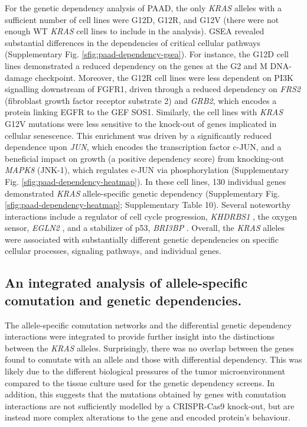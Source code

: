 \documentclass[english, 10pt, letterpaper]{article}
\newcommand{\KRAS}{\emph{KRAS}}
\begin{document}
For the genetic dependency analysis of PAAD, the only \KRAS{} alleles with a sufficient number of cell lines were G12D, G12R, and G12V (there were not enough WT \KRAS{} cell lines to include in the analysis).
GSEA revealed substantial differences in the dependencies of critical cellular pathways (Supplementary Fig. \ref{sfig:paad-dependency-gsea}).
For instance, the G12D cell lines demonstrated a reduced dependency on the genes at the G2 and M DNA-damage checkpoint.
Moreover, the G12R cell lines were less dependent on PI3K signalling downstream of FGFR1, driven through a reduced dependency on \emph{FRS2} (fibroblast growth factor receptor substrate 2) and \emph{GRB2}, which encodes a protein linking EGFR to the GEF SOS1.
Similarly, the cell lines with \KRAS{} G12V mutations were less sensitive to the knock-out of genes implicated in cellular senescence.
This enrichment was driven by a significantly reduced dependence upon \emph{JUN}, which encodes the transcription factor c-JUN, and a beneficial impact on growth (a positive dependency score) from knocking-out \emph{MAPK8} (JNK-1), which regulates c-JUN via phosphorylation (Supplementary Fig. \ref{sfig:paad-dependency-heatmap}).
In these cell lines, 130 individual genes demonstrated \KRAS{} allele-specific genetic dependency (Supplementary Fig. \ref{sfig:paad-dependency-heatmap}; Supplementary Table 10).
Several noteworthy interactions include a regulator of cell cycle progression, \emph{KHDRBS1} \cite{Barlat1997ADomain}, the oxygen sensor, \emph{EGLN2} \cite{Ivan2017TheFeedbacks}, and a stabilizer of p53, \emph{BRI3BP} \cite{Ha2008HCCRBP-1Stabilization}.
Overall, the \KRAS{} alleles were associated with substantially different genetic dependencies on specific cellular processes, signaling pathways, and individual genes.


\subsection*{An integrated analysis of allele-specific comutation and genetic dependencies.}


The allele-specific comutation networks and the differential genetic dependency interactions were integrated to provide further insight into the distinctions between the \KRAS{} alleles.
Surprisingly, there was no overlap between the genes found to comutate with an allele and those with differential dependency.
This was likely due to the different biological pressures of the tumor microenvironment compared to the tissue culture used for the genetic dependency screens.
In addition, this suggests that the mutations obtained by genes with comutation interactions are not sufficiently modelled by a CRISPR-Cas9 knock-out, but are instead more complex alterations to the gene and encoded protein's behaviour.
\end{document}
